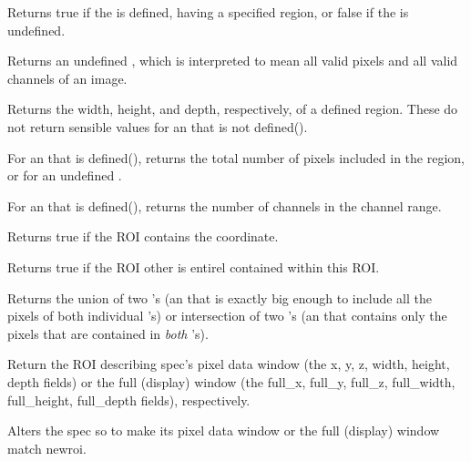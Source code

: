 Returns {\cf true} if the \ROI is defined, having a specified region,
or {\cf false} if the \ROI is undefined.
\apiend

Returns an undefined \ROI, which is interpreted to mean all valid pixels
and all valid channels of an image.
\apiend

Returns the width, height, and depth, respectively, of a defined region.
These do not return sensible values for an \ROI that is not {\cf defined()}.
\apiend

For an \ROI that is {\cf defined()}, returns the total number of pixels
included in the region, or {} for an undefined \ROI.
\apiend

For an \ROI that is {\cf defined()}, returns the number of channels
in the channel range.
\apiend

\NEW %
Returns {\cf true} if the ROI contains the coordinate.
\apiend

\NEW %
Returns {\cf true} if the ROI {\cf other} is entirel contained within
this ROI.
\apiend

Returns the union of two \ROI's (an \ROI that is exactly big enough
to include all the pixels of both individual \ROI's) or intersection
of two \ROI's (an \ROI that contains only the pixels that are contained
in \emph{both} \ROI's).
\apiend

Return the ROI describing {\cf spec}'s pixel data window (the {\cf x, y, z,
width, height, depth} fields)
or the full (display) window (the {\cf full_x, full_y, full_z,
full_width, full_height, full_depth} fields), respectively.
\apiend

Alters the {\cf spec} so to make its pixel data window 
or the full (display) window match {\cf newroi}.
\apiend


